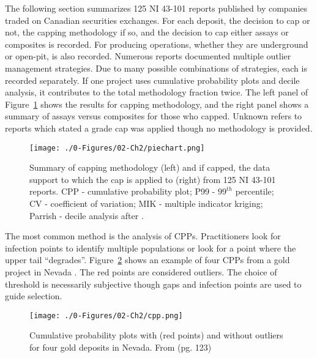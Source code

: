 The following section summarizes 125 NI 43-101 reports published by companies traded on Canadian securities exchanges. For each deposit, the decision to cap or not, the capping methodology if so, and the decision to cap either assays or composites is recorded. For producing operations, whether they are underground or open-pit, is also recorded. Numerous reports documented multiple outlier management strategies. Due to many possible combinations of strategies, each is recorded separately. If one project uses cumulative probability plots and decile analysis, it contributes to the total methodology fraction twice. The left panel of Figure~\ref{fig:piechart} shows the results for capping methodology, and the right panel shows a summary of assays versus composites for those who capped. Unknown refers to reports which stated a grade cap was applied though no methodology is provided.

\begin{figure}[htb!]
    \centering
    \texttt{[image: ./0-Figures/02-Ch2/piechart.png]}
    \caption{Summary of capping methodology (left) and if capped, the data support to which the cap is applied to (right) from 125 NI 43-101 reports. CPP - cumulative probability plot; P99 - $99^{th}$ percentile; CV - coefficient of variation; MIK - multiple indicator kriging; Parrish - decile analysis after \cite{parrish1997geologist}.}
    \label{fig:piechart}
\end{figure}

The most common method is the analysis of \glspl{CPP}. Practitioners look for infection points to identify multiple populations or look for a point where the upper tail ``degrades''. Figure~\ref{fig:cpp} shows an example of four \glspl{CPP} from a gold project in Nevada \citep{fiore2021}. The red points are considered outliers. The choice of threshold is necessarily subjective though gaps and infection points are used to guide selection.

\begin{figure}[htb!]
    \centering
    \texttt{[image: ./0-Figures/02-Ch2/cpp.png]}
    \caption{Cumulative probability plots with (red points) and without outliers for four gold deposits in Nevada. From \cite{fiore2021} (pg. 123)}
    \label{fig:cpp}
\end{figure}

